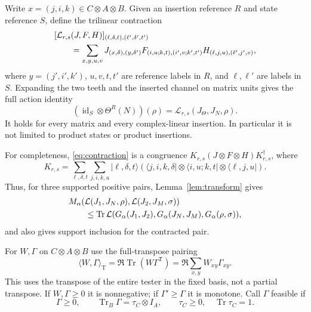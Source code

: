 \documentclass[11pt]{article}
\newcommand{\Tr}{\operatorname{Tr}}
\newcommand{\id}{\operatorname{id}}
\newcommand{\G}{G_\alpha}
\newcommand{\M}{M_\alpha}
\newcommand{\pair}[2]{\langle #1,#2\rangle_{\mathrm T}}
\newcommand{\ket}[1]{\lvert #1\rangle}
\newcommand{\bra}[1]{\langle #1\rvert}
\theoremstyle{remark}
\begin{document}
Write $x=(j,i,k)\in C\otimes A\otimes B$. Given an insertion reference $R$
and state reference $S$, define the trilinear contraction
\begin{align}\label{eq:contraction}
 &[\mathcal L_{r,s}(J,F,H)]_{(\ell,\delta,t),(\ell',\delta',t')}
 \\
 &\qquad=\sum_{x,y,u,v}
 J_{(x,\delta),(y,\delta')}
 F_{(i,u;k,t),(i',v;k',t')}
 H_{(\ell,j,u),(\ell',j',v)},\notag
\end{align}
where $y=(j',i',k')$, $u,v,t,t'$ are reference labels in $R$, and
$\ell,\ell'$ are labels in $S$. Expanding the two teeth and the inserted
channel on matrix units gives the full action identity
\begin{equation}\label{eq:action}
 (\id_S\otimes\Theta^R(N))(\rho)
                 =\mathcal L_{r,s}(J_\Theta,J_N,\rho).
\end{equation}
It holds for every matrix and every complex-linear insertion. In particular
it is not limited to product states or product insertions.

For completeness, \eqref{eq:contraction} is a congruence
$K_{r,s}(J\otimes F\otimes H)K_{r,s}^\dagger$, where
\[
 K_{r,s}=\sum_{\ell,\delta,t}\sum_{j,i,k,u}
 \ket{\ell,\delta,t}
 (\bra{j,i,k,\delta}\otimes\bra{i,u;k,t}\otimes\bra{\ell,j,u}).
\]
Thus, for three supported positive pairs, Lemma~\ref{lem:transform} gives
\begin{align}\label{eq:combchain}
 &\M(\mathcal L(J_1,J_N,\rho),\mathcal L(J_2,J_M,\sigma))
 \\
 &\qquad\leq\Tr\mathcal L(\G(J_1,J_2),\G(J_N,J_M),\G(\rho,\sigma)),\notag
\end{align}
and also gives support inclusion for the contracted pair.

For $W,\Gamma$ on $C\otimes A\otimes B$ use the full-transpose pairing
\begin{equation}\label{eq:pairing}
 \pair{W}{\Gamma}=\Re\Tr(W\Gamma^{\mathsf T})
                     =\Re\sum_{x,y}W_{xy}\Gamma_{xy}.
\end{equation}
This uses the transpose of the entire tester in the fixed basis, not a
partial transpose. If $W,\Gamma\geq0$ it is nonnegative; if
$\Gamma'\geq\Gamma$ it is monotone. Call $\Gamma$ feasible if
\begin{equation}\label{eq:feasible}
 \Gamma\geq0,\qquad\Tr_B\Gamma=\tau_C\otimes I_A,
 \qquad\tau_C\geq0,\quad\Tr\tau_C=1.
\end{equation}
\end{document}
